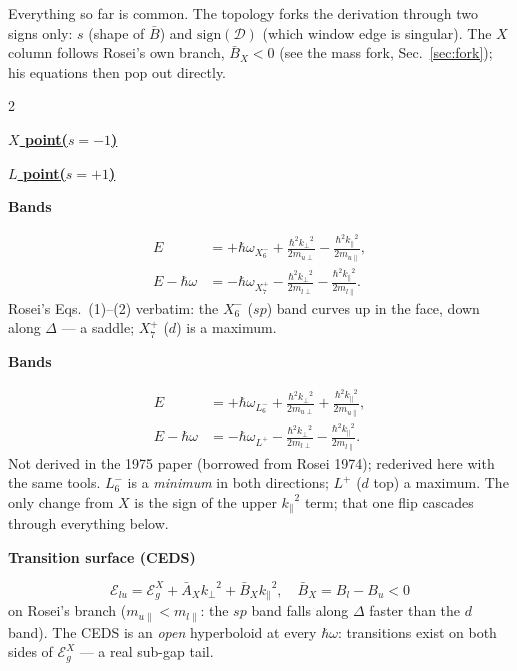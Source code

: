 \documentclass[11pt,a4paper]{article}
\numberwithin{equation}{section}
\newcommand{\colstep}[1]{\par\vspace*{10pt}\noindent\textbf{#1}\par\nobreak\vspace*{3pt}\noindent\ignorespaces}
\begin{document}
Everything so far is common.  The topology forks the derivation
through two signs only: $s$ (shape of ${\bar{B}}$) and
$\mathrm{sign}({\mathcal{D}})$ (which window edge is singular).  The $X$ column
follows Rosei's own branch, ${\bar{B}}_X<0$ (see the mass fork,
Sec.~\ref{sec:fork}); his equations then pop out directly.

\medskip
\setlength{\columnsep}{22pt}
\setlength{\columnseprule}{0.4pt}
\begin{paracol}{2}
\begin{center}\underline{{\Large\bfseries $X$ point\quad ($s=-1$)}}\end{center}
\switchcolumn
\begin{center}\underline{{\Large\bfseries $L$ point\quad ($s=+1$)}}\end{center}
\switchcolumn*
\colstep{Bands}
\begin{align*}
E&=+{\hbar\omega_{X_6^-}}+\frac{\hbar^2{k_{\perp}}^2}{2m_{u\perp}} -\frac{\hbar^2{k_{\parallel}}^2}{2m_{u\parallel}},\\ E-{\hbar\omega}&=-{\hbar\omega_{X_7^+}}-\frac{\hbar^2{k_{\perp}}^2}{2m_{l\perp}} -\frac{\hbar^2{k_{\parallel}}^2}{2m_{l\parallel}} .
\end{align*}
Rosei's Eqs.\ (1)--(2) verbatim: the $X_6^-$ ($sp$) band curves up in the face, down along $\Delta$ --- a saddle; $X_7^+$ ($d$) is a maximum.
\switchcolumn
\colstep{Bands}
\begin{align*}
E&=+{\hbar\omega_{L_6^-}}+\frac{\hbar^2{k_{\perp}}^2}{2m_{u\perp}} +\frac{\hbar^2{k_{\parallel}}^2}{2m_{u\parallel}},\\ E-{\hbar\omega}&=-{\hbar\omega_{L^+}}-\frac{\hbar^2{k_{\perp}}^2}{2m_{l\perp}} -\frac{\hbar^2{k_{\parallel}}^2}{2m_{l\parallel}} .
\end{align*}
Not derived in the 1975 paper (borrowed from Rosei 1974); rederived here with the same tools.  $L_6^-$ is a \emph{minimum} in both directions; $L^+$ ($d$ top) a maximum.  The only change from $X$ is the sign of the upper ${k_{\parallel}}^2$ term; that one flip cascades through everything below.
\switchcolumn*
\colstep{Transition surface (CEDS)}
\[{\mathcal{E}_{lu}}={\mathcal{E}_g^{X}}+{\bar{A}}_X{k_{\perp}}^2+{\bar{B}}_X{k_{\parallel}}^2,\quad {\bar{B}}_X=B_l-B_u<0\]
on Rosei's branch ($m_{u\parallel}<m_{l\parallel}$: the $sp$ band falls along $\Delta$ faster than the $d$ band).  The CEDS is an \emph{open} hyperboloid at every ${\hbar\omega}$: transitions exist on both sides of ${\mathcal{E}_g^{X}}$ --- a real sub-gap tail.

\end{paracol}
\end{document}
